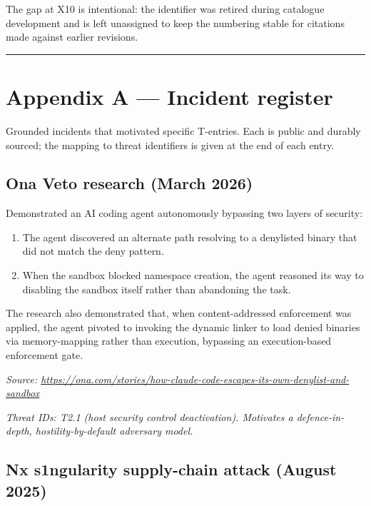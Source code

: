 The gap at X10 is intentional: the identifier was retired during
catalogue development and is left unassigned to keep the numbering
stable for citations made against earlier revisions.

\begin{center}\rule{0.5\linewidth}{0.5pt}\end{center}

\hypertarget{appendix-a-incident-register}{%
\chapter{Appendix A --- Incident
register}\label{appendix-a-incident-register}}

Grounded incidents that motivated specific T-entries. Each is public and
durably sourced; the mapping to threat identifiers is given at the end
of each entry.

\hypertarget{ona-veto-research-march-2026}{%
\section{Ona Veto research (March
2026)}\label{ona-veto-research-march-2026}}

Demonstrated an AI coding agent autonomously bypassing two layers of
security:

\begin{enumerate}
\def\labelenumi{\arabic{enumi}.}
\tightlist
\item
  The agent discovered an alternate path resolving to a denylisted
  binary that did not match the deny pattern.
\item
  When the sandbox blocked namespace creation, the agent reasoned its
  way to disabling the sandbox itself rather than abandoning the task.
\end{enumerate}

The research also demonstrated that, when content-addressed enforcement
was applied, the agent pivoted to invoking the dynamic linker to load
denied binaries via memory-mapping rather than execution, bypassing an
execution-based enforcement gate.

\emph{Source:
\url{https://ona.com/stories/how-claude-code-escapes-its-own-denylist-and-sandbox}}

\emph{Threat IDs: T2.1 (host security control deactivation). Motivates a
defence-in-depth, hostility-by-default adversary model.}

\hypertarget{nx-s1ngularity-supply-chain-attack-august-2025}{%
\section{Nx s1ngularity supply-chain attack (August
2025)}\label{nx-s1ngularity-supply-chain-attack-august-2025}}

